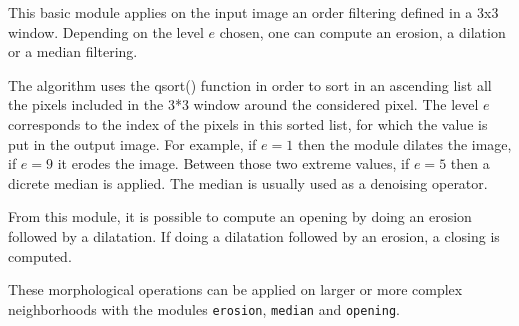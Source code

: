 This basic module applies on the input image an order filtering defined
in a 3x3 window.
Depending on the level $e$ chosen, one can compute an erosion, a dilation or a median filtering.

The algorithm uses the qsort() function in order to 
sort in an ascending list all the pixels included in the
3*3 window around the considered pixel.
The level $e$ corresponds to the index of the pixels 
in this sorted list, for which the value is put in the 
output image.
For example, if $e=1$ then the module dilates the image, if $e=9$ it erodes the image.
Between those two extreme values, if $e=5$ then a dicrete median is applied. 
The median is usually used as a denoising operator.

From this module, it is possible to compute an opening by doing an erosion followed by a dilatation.
If doing a dilatation followed by an erosion, a closing is computed.

These morphological operations can be applied 
on larger or more complex neighborhoods
with the modules \verb+erosion+, \verb+median+ and 
\verb+opening+.